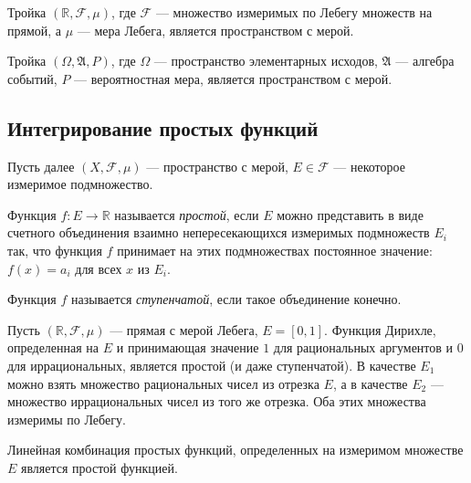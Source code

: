 \begin{theorem}
    Тройка $(\mathbb R, \mathcal F, \mu)$, где $\mathcal F$ --- множество
    измеримых по Лебегу множеств на прямой, а $\mu$ --- мера Лебега, является
    пространством с мерой.
\end{theorem}

\begin{example}
    Тройка $(\Omega, \mathfrak A, P)$, где $\Omega$ ---
    пространство элементарных исходов, 
    $\mathfrak A$ --- алгебра событий, $P$ --- вероятностная мера,
    является пространством с мерой.
\end{example}

\subsection{Интегрирование простых функций}

Пусть далее $(X, \mathcal F, \mu)$ --- пространство с мерой, 
$E \in \mathcal F$ --- некоторое измеримое подмножество.

\begin{definition}
    Функция $f \colon E \to \mathbb R$ называется \emph{простой}, если $E$ можно
    представить в виде счетного объединения взаимно непересекающихся измеримых
    подмножеств $E_i$ так, что функция $f$ принимает на этих подмножествах
    постоянное значение: $f(x) = a_i$ для всех $x$ из $E_i$.

    Функция $f$ называется \emph{ступенчатой}, если такое объединение конечно.
\end{definition}

\begin{example}
    Пусть $(\mathbb R, \mathcal F, \mu)$ --- прямая с мерой Лебега, $E = [0,
    1]$. Функция Дирихле, определенная на $E$ и принимающая значение $1$ 
    для рациональных аргументов и $0$ для иррациональных, является простой (и
    даже ступенчатой).
    В качестве $E_1$ можно взять множество рациональных чисел из отрезка $E$, а
    в качестве $E_2$ --- множество иррациональных чисел из того же отрезка. Оба
    этих множества измеримы по Лебегу.
\end{example}

\begin{lemma}\label{le:lincombsimple}
    Линейная комбинация простых функций, определенных на измеримом множестве $E$
    является простой функцией.
\end{lemma}

